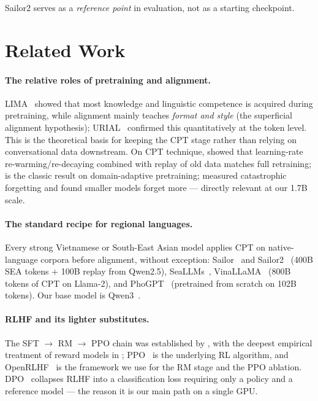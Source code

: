 \documentclass[10pt,twocolumn]{article}
\begin{document}
Sailor2 serves as a \emph{reference point} in evaluation, not as a starting checkpoint.

\section{Related Work}

\paragraph{The relative roles of pretraining and alignment.}
LIMA~\citep{zhou2023lima} showed that most knowledge and linguistic competence is acquired during pretraining, while alignment mainly teaches \emph{format and style} (the superficial alignment hypothesis); URIAL~\citep{lin2023urial} confirmed this quantitatively at the token level. This is the theoretical basis for keeping the CPT stage rather than relying on conversational data downstream. On CPT technique, \citet{ibrahim2024simple} showed that learning-rate re-warming/re-decaying combined with replay of old data matches full retraining; \citet{gururangan2020dont} is the classic result on domain-adaptive pretraining; \citet{luo2023forgetting} measured catastrophic forgetting and found smaller models forget more --- directly relevant at our 1.7B scale.

\paragraph{The standard recipe for regional languages.}
Every strong Vietnamese or South-East Asian model applies CPT on native-language corpora before alignment, without exception: Sailor~\citep{dou2024sailor} and Sailor2~\citep{dou2025sailor2} (400B SEA tokens + 100B replay from Qwen2.5), SeaLLMs~\citep{nguyen2023seallms}, VinaLLaMA~\citep{nguyen2023vinallama} (800B tokens of CPT on Llama-2), and PhoGPT~\citep{nguyen2023phogpt} (pretrained from scratch on 102B tokens). Our base model is Qwen3~\citep{qwen3report}.

\paragraph{RLHF and its lighter substitutes.}
The SFT $\to$ RM $\to$ PPO chain was established by \citet{christiano2017preferences,stiennon2020summarize,ouyang2022instructgpt}, with the deepest empirical treatment of reward models in \citet{bai2022hh}; PPO~\citep{schulman2017ppo} is the underlying RL algorithm, and OpenRLHF~\citep{hu2024openrlhf} is the framework we use for the RM stage and the PPO ablation. DPO~\citep{rafailov2023dpo} collapses RLHF into a classification loss requiring only a policy and a reference model --- the reason it is our main path on a single GPU.
\end{document}
